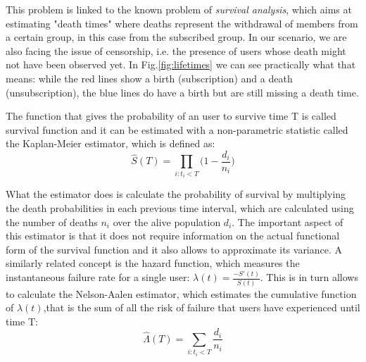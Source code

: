 \documentclass[paper=a4, fontsize=10pt]{report}
\begin{document}
This problem is linked to the known problem of \textit{survival analysis}, which aims at estimating "death times" where deaths represent the withdrawal of members from a certain group,
in this case from the subscribed group. In our scenario, we are also facing the issue of censorship, i.e. the presence of users whose death might not have been observed yet. In Fig.\ref{fig:lifetimes} we can see practically what that means: while the red lines show a birth (subscription)
and a death (unsubscription), the blue lines do have a birth but are still missing a death time.


The function that gives the probability of an user to survive time T is called survival function and it can be estimated
with a non-parametric statistic called the Kaplan-Meier estimator, which is defined as:
\begin{equation}
 \hat{S}(T) = \prod_{i: t_{i} < T} \Big(1 - \frac{d_{i}}{n_{i}} \Big)
\end{equation}


What the estimator does is calculate the probability of survival by multiplying the death probabilities in each previous time interval, which
are calculated using the number of deaths $n_{i}$ over the alive population $d_{i}$. The important aspect of this 
estimator is that it does not require information on the actual functional form of the survival function
and it also allows to approximate its variance. A similarly related concept is the hazard function, which measures
the instantaneous failure rate for a single user: $ \lambda (t) = \frac{-S'(t)}{S(t)}
$. This is in turn allows to calculate the Nelson-Aalen estimator, which estimates the cumulative function of $\lambda(t)$,that
is the sum of all the risk of failure that users have experienced until time T:
\begin{equation}
 \hat{\Lambda}(T) = \sum_{i: t_{i} < T}  \frac{d_{i}}{n_{i}}
\end{equation}
\end{document}
